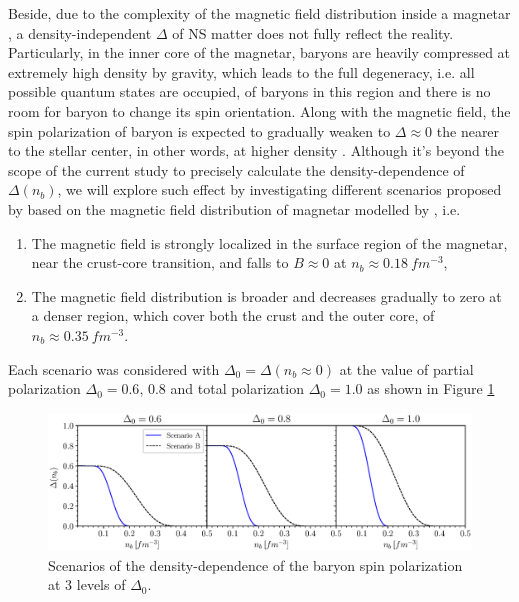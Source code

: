 Beside, due to the complexity of the magnetic field distribution inside a magnetar \citep{fujisawa2014magnetic}, a density-independent $\Delta$ of \gls{NS} matter does not fully reflect the reality. Particularly, in the inner core of the magnetar, baryons are heavily compressed at extremely high density by gravity, which leads to the full degeneracy, i.e. all possible quantum states are occupied, of baryons in this region and there is no room for baryon to change its spin orientation. Along with the magnetic field, the spin polarization of baryon is expected to gradually weaken to $\Delta \approx 0$ the nearer to the stellar center, in other words, at higher density \citep{fujisawa2014magnetic,tan2020spin}. Although it's beyond the scope of the current study to precisely calculate the density-dependence of $\Delta(n_b)$, we will explore such effect by investigating different scenarios proposed by \cite{tan2020spin} based on the magnetic field distribution of magnetar modelled by \cite{fujisawa2014magnetic}, i.e.
\begin{enumerate}[label=(\Alph*)]
    \item The magnetic field is strongly localized in the surface region of the magnetar, near the crust-core transition, and falls to $B\approx 0$ at $n_b \approx 0.18\: fm^{-3}$,
    \item The magnetic field distribution is broader and decreases gradually to zero at a denser region, which cover both the crust and the outer core, of $n_b \approx 0.35\:fm^{-3}$.
\end{enumerate}
Each scenario was considered with $\Delta_0 = \Delta(n_b \approx 0)$ at the value of partial polarization $\Delta_0 = 0.6$, $0.8$ and total polarization $\Delta_0 = 1.0$ as shown in Figure \ref{fig:Delta}
\begin{figure}[ht!]
    \centering
    \includegraphics[width=\textwidth]{fig/Delta.eps}
    \caption{Scenarios of the density-dependence of the baryon spin polarization at 3 levels of $\Delta_0$.}
    \label{fig:Delta}
\end{figure} 

